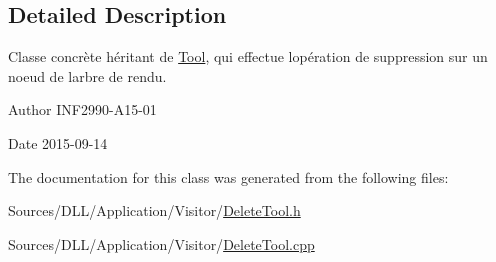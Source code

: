 \subsection{Detailed Description}
Classe concrète héritant de \hyperlink{class_tool}{Tool}, qui effectue l\textquotesingle{}opération de suppression sur un noeud de l\textquotesingle{}arbre de rendu. 

\begin{DoxyAuthor}{Author}
I\+N\+F2990-\/\+A15-\/01 
\end{DoxyAuthor}
\begin{DoxyDate}{Date}
2015-\/09-\/14 
\end{DoxyDate}


The documentation for this class was generated from the following files\+:\begin{DoxyCompactItemize}
\item 
Sources/\+D\+L\+L/\+Application/\+Visitor/\hyperlink{_delete_tool_8h}{Delete\+Tool.\+h}\item 
Sources/\+D\+L\+L/\+Application/\+Visitor/\hyperlink{_delete_tool_8cpp}{Delete\+Tool.\+cpp}\end{DoxyCompactItemize}
